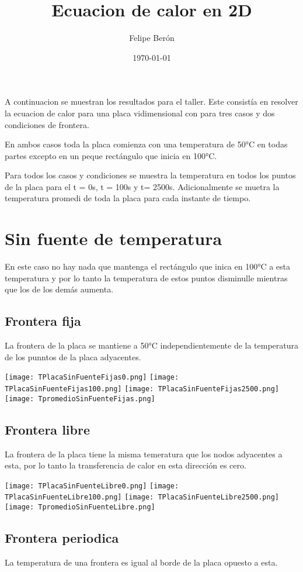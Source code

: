 \documentclass[11pt, spanish]{article}
\title{Ecuacion de calor en 2D}
\author{Felipe Berón}
\date{\today}
\begin{document}
\maketitle

A continuacion se muestran los resultados para el taller. Este consistía en resolver la ecuacion de calor para una placa vidimensional con para tres casos y dos condiciones de frontera.

En ambos casos toda la placa comienza con una temperatura de 50°C en todas partes excepto en un peque rectángulo que inicia en 100°C.

Para todos los casos y condiciones se muestra la temperatura en todos los puntos de la placa para el t = 0s, t = 100s y t= 2500s. Adicionalmente se muetra la temperatura promedi de toda la placa para cada instante de tiempo.

\section{Sin fuente de temperatura}
En este caso no hay nada que mantenga el rectángulo que inica en 100°C a esta temperatura y por lo tanto la temperatura de estos puntos disminulle mientras que los de los demás aumenta.
\subsection{Frontera fija}
La frontera de la placa se mantiene a 50°C independientemente de la temperatura de los punntos de la placa adyacentes.

\texttt{[image: TPlacaSinFuenteFijas0.png]}
\texttt{[image: TPlacaSinFuenteFijas100.png]}
\texttt{[image: TPlacaSinFuenteFijas2500.png]}
\texttt{[image: TpromedioSinFuenteFijas.png]}

\subsection{Frontera libre}
La frontera de la placa tiene la misma temeratura que los nodos adyacentes a esta, por lo tanto la transferencia de calor en esta dirección es cero.

\texttt{[image: TPlacaSinFuenteLibre0.png]}
\texttt{[image: TPlacaSinFuenteLibre100.png]}
\texttt{[image: TPlacaSinFuenteLibre2500.png]}
\texttt{[image: TpromedioSinFuenteLibre.png]}

\subsection{Frontera periodica}
La temperatura de una frontera es igual al borde de la placa opuesto a esta.
\end{document}
